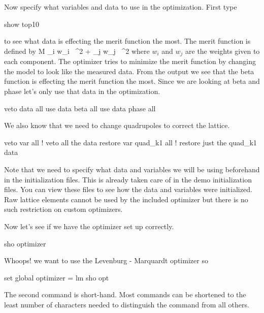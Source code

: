 Now specify what variables and data to use in the optimization. First type
\begin{example}
  show top10
\end{example}
to see what data is effecting the merit function the most. The merit function is
defined by
\Begineq
  {\cal M} \equiv \sum_{i} w_i \,
    ^2 + 
  \sum_{j} w_j \,
    ^2
  \label{eq:merit}
\Endeq
where $w_{i}$ and $w_{j}$ are the weights given to each component.
The optimizer tries to minimize the merit function by changing the model to look
like the measured data. From the  output we see that the beta function is effecting 
the merit function the most. Since we
are looking at beta and phase let's only use that data in the optimization.
\begin{example}
  veto data all
  use  data beta all
  use  data phase all
\end{example}
We also know that we need to change quadrupoles to correct the lattice.
\begin{example}
  veto var all         ! veto all the data
  restore var quad\_k1 all ! restore just the quad\_k1 data
\end{example}
Note that we need to specify what data and variables we will be using beforehand in the
initialization files. This is already taken care of in the demo initialization
files. You can view these files to see how the data and variables were
initialized. Raw lattice elements cannot be used by the included optimizer but
there is no such restriction on custom optimizers.

Now let's see if we have the optimizer set up correctly.
\begin{example}
  sho optimizer
\end{example}
Whoops! we want to use the Levenburg - Marquardt optimizer so
\begin{example}
  set global optimizer = lm
  sho opt
\end{example}
The second command is short-hand. Most \tao commands can be shortened to the
least number of characters needed to distinguish the command from all others.

